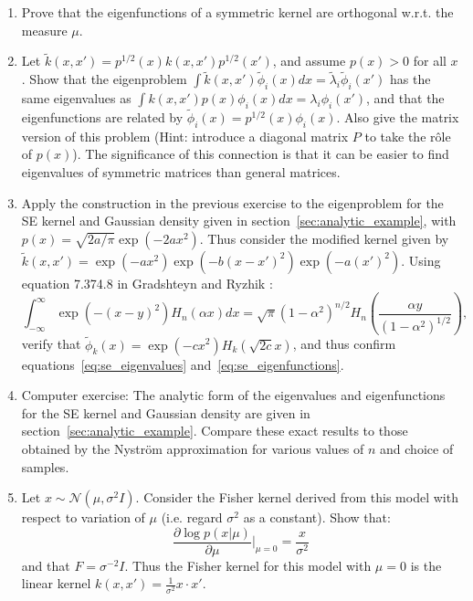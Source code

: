 \documentclass[11pt]{book}
\begin{document}
\begin{enumerate}
\item Prove that the eigenfunctions of a symmetric kernel are orthogonal w.r.t. the measure $\mu$.

\item Let $\tilde{k}(x, x') = p^{1/2}(x) k(x, x') p^{1/2}(x')$, and assume $p(x) > 0$ for all $x$. Show that the eigenproblem $\int \tilde{k}(x, x') \tilde{\phi}_i(x) dx = \tilde{\lambda}_i \tilde{\phi}_i(x')$ has the same eigenvalues as $\int k(x, x') p(x) \phi_i(x) dx = \lambda_i \phi_i(x')$, and that the eigenfunctions are related by $\tilde{\phi}_i(x) = p^{1/2}(x) \phi_i(x)$. Also give the matrix version of this problem (Hint: introduce a diagonal matrix $P$ to take the rôle of $p(x)$). The significance of this connection is that it can be easier to find eigenvalues of symmetric matrices than general matrices.

\item \label{ex:se_eigenfunction_proof} Apply the construction in the previous exercise to the eigenproblem for the SE kernel and Gaussian density given in section~\ref{sec:analytic_example}, with $p(x) = \sqrt{2a/\pi} \exp(-2ax^2)$. Thus consider the modified kernel given by $\tilde{k}(x, x') = \exp(-ax^2) \exp(-b(x-x')^2) \exp(-a(x')^2)$. Using equation 7.374.8 in Gradshteyn and Ryzhik \cite{gradshteyn1980}:
\begin{equation}
\label{eq:hermite_integral}
\int_{-\infty}^\infty \exp(-(x-y)^2) H_n(\alpha x) dx = \sqrt{\pi}(1-\alpha^2)^{n/2} H_n\left(\frac{\alpha y}{(1-\alpha^2)^{1/2}}\right),
\end{equation}
verify that $\tilde{\phi}_k(x) = \exp(-cx^2) H_k(\sqrt{2c}x)$, and thus confirm equations~\eqref{eq:se_eigenvalues} and~\eqref{eq:se_eigenfunctions}.

\item Computer exercise: The analytic form of the eigenvalues and eigenfunctions for the SE kernel and Gaussian density are given in section~\ref{sec:analytic_example}. Compare these exact results to those obtained by the Nyström approximation for various values of $n$ and choice of samples.

\item \label{ex:gaussian_fisher} Let $x \sim \mathcal{N}(\mu, \sigma^2 I)$. Consider the Fisher kernel derived from this model with respect to variation of $\mu$ (i.e. regard $\sigma^2$ as a constant). Show that:
\begin{equation}
\label{eq:gaussian_fisher_score}
\frac{\partial \log p(x|\mu)}{\partial \mu}\bigg|_{\mu=0} = \frac{x}{\sigma^2}
\end{equation}
and that $F = \sigma^{-2} I$. Thus the Fisher kernel for this model with $\mu = 0$ is the linear kernel $k(x, x') = \frac{1}{\sigma^2} x \cdot x'$.


\end{enumerate}
\end{document}
